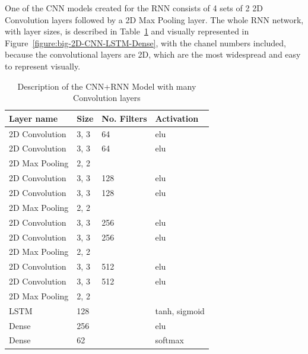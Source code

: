 \documentclass[12pt]{article}
\theoremstyle{definition}
\begin{document}
	One of the CNN models created for the RNN consists of 4 sets of 2 2D Convolution layers followed by a 2D Max Pooling layer. The whole RNN network, with layer sizes, is described in Table~\ref{table:big-CNN-LSTM} and visually represented in Figure~\ref{figure:big-2D-CNN-LSTM-Dense}, with the chanel numbers included, because the convolutional layers are 2D, which are the most widespread and easy to represent visually.

	\begin{table}[h]
		\centering
		\renewcommand{\arraystretch}{1.5}

		\caption{Description of the CNN+RNN Model with many Convolution layers}
		\label{table:big-CNN-LSTM}

		\begin{tabularx}{\textwidth}{XXXX}
			\textbf{Layer name} & \textbf{Size} & \textbf{No. Filters} & \textbf{Activation} \\ \hline
			2D Convolution & 3, 3 & 64                   & elu                  \\ \hline
			2D Convolution & 3, 3 & 64                   & elu                  \\ \hline
			2D Max Pooling & 2, 2 & \textbf{\textendash} & \textbf{\textendash} \\ \hline
			2D Convolution & 3, 3 & 128                  & elu                  \\ \hline
			2D Convolution & 3, 3 & 128                  & elu                  \\ \hline
			2D Max Pooling & 2, 2 & \textbf{\textendash} & \textbf{\textendash} \\ \hline
			2D Convolution & 3, 3 & 256                  & elu                  \\ \hline
			2D Convolution & 3, 3 & 256                  & elu                  \\ \hline
			2D Max Pooling & 2, 2 & \textbf{\textendash} & \textbf{\textendash} \\ \hline
			2D Convolution & 3, 3 & 512                  & elu                  \\ \hline
			2D Convolution & 3, 3 & 512                  & elu                  \\ \hline
			2D Max Pooling & 2, 2 & \textbf{\textendash} & \textbf{\textendash} \\ \hline
			LSTM           & 128  & \textbf{\textendash} & tanh, sigmoid        \\ \hline
			Dense          & 256  & \textbf{\textendash} & elu                  \\ \hline
			Dense          & 62   & \textbf{\textendash} & softmax              \\
		\end{tabularx}
	\end{table}
\end{document}
